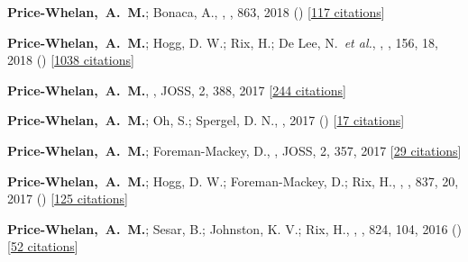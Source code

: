 \item[{\color{deemph}\scriptsize13}]\textbf{Price-Whelan,~A.~M.}; Bonaca, A., , \apj, 863, 2018 () [\href{http://adsabs.harvard.edu/abs/2018ApJ...863L..20P}{117 citations}]

\item[{\color{deemph}\scriptsize12}]\textbf{Price-Whelan,~A.~M.}; Hogg, D. W.; Rix, H.; De Lee, N.~\textit{et al.}, , \aj, 156, 18, 2018 () [\href{http://adsabs.harvard.edu/abs/2018AJ....156...18P}{1038 citations}]

\item[{\color{deemph}\scriptsize11}]\textbf{Price-Whelan,~A.~M.}, , JOSS, 2, 388, 2017 [\href{http://adsabs.harvard.edu/abs/2017JOSS....2..388P}{244 citations}]

\item[{\color{deemph}\scriptsize10}]\textbf{Price-Whelan,~A.~M.}; Oh, S.; Spergel, D. N., , 2017 () [\href{http://adsabs.harvard.edu/abs/2017arXiv170903532P}{17 citations}]

\item[{\color{deemph}\scriptsize9}]\textbf{Price-Whelan,~A.~M.}; Foreman-Mackey, D., , JOSS, 2, 357, 2017 [\href{http://adsabs.harvard.edu/abs/2017JOSS....2..357P}{29 citations}]

\item[{\color{deemph}\scriptsize8}]\textbf{Price-Whelan,~A.~M.}; Hogg, D. W.; Foreman-Mackey, D.; Rix, H., , \apj, 837, 20, 2017 () [\href{http://adsabs.harvard.edu/abs/2017ApJ...837...20P}{125 citations}]

\item[{\color{deemph}\scriptsize7}]\textbf{Price-Whelan,~A.~M.}; Sesar, B.; Johnston, K. V.; Rix, H., , \apj, 824, 104, 2016 () [\href{http://adsabs.harvard.edu/abs/2016ApJ...824..104P}{52 citations}]

